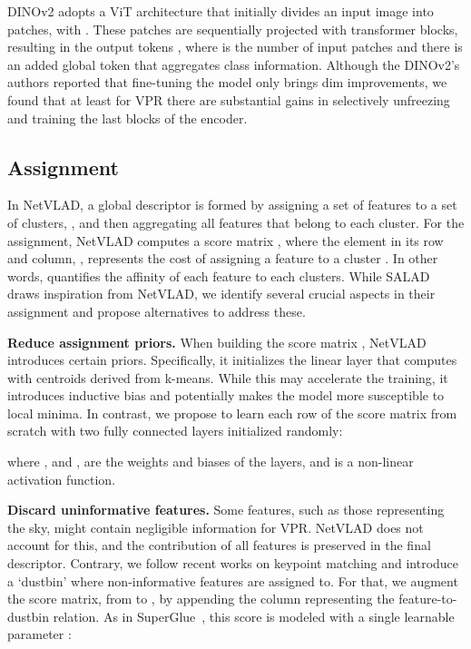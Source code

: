 \documentclass[10pt,twocolumn,letterpaper]{article}
\begin{document}
DINOv2 adopts a ViT architecture that initially divides an input image  into  patches, with . These patches are sequentially projected with transformer blocks, resulting in the output tokens , where  is the number of input patches and there is an added global token  that aggregates class information. Although the DINOv2's authors reported that fine-tuning the model only brings dim improvements, we found that at least for VPR there are substantial gains in selectively unfreezing and training the last blocks of the encoder. 



\subsection{Assignment}
\label{subsec:assignment}


In NetVLAD, a global descriptor is formed by assigning a set of features to a set of clusters, , and then aggregating all features that belong to each cluster. For the assignment, NetVLAD computes a score matrix , where the element in its  row and  column, , represents the cost of assigning a feature to a cluster . In other words,  quantifies the affinity of each feature to each clusters. While SALAD draws inspiration from NetVLAD, we identify several crucial aspects in their assignment and propose alternatives to address these.


\textbf{Reduce assignment priors.} When building the score matrix , NetVLAD introduces certain priors. Specifically, it initializes the linear layer that computes  with centroids derived from k-means. While this may accelerate the training, it introduces inductive bias and potentially makes the model more susceptible to local minima. In contrast, we propose to learn each row  of the score matrix from scratch with two fully connected layers initialized randomly:

where ,  and ,  are the weights and biases of the layers, and  is a non-linear activation function.

\textbf{Discard uninformative features.} Some features, such as those representing the sky, might contain negligible information for VPR. NetVLAD does not account for this, and the contribution of all features is preserved in the final descriptor. Contrary, we follow recent works on keypoint matching and introduce a `dustbin' where non-informative features are assigned to. For that, we augment the score matrix, from  to , by appending the column  representing the feature-to-dustbin relation. As in SuperGlue~\cite{sarlin2020superglue}, this score is modeled with a single learnable parameter :
\end{document}
